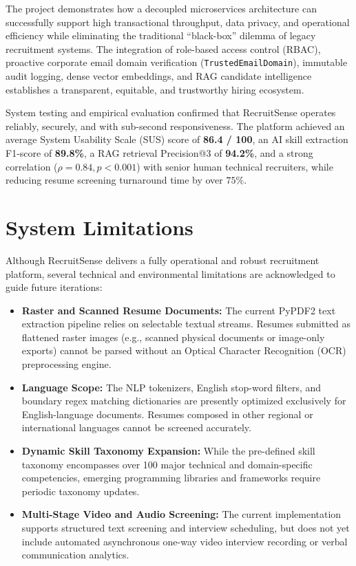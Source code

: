 The project demonstrates how a decoupled microservices architecture can successfully support high transactional throughput, data privacy, and operational efficiency while eliminating the traditional ``black-box'' dilemma of legacy recruitment systems. The integration of role-based access control (RBAC), proactive corporate email domain verification (\texttt{TrustedEmailDomain}), immutable audit logging, dense vector embeddings, and RAG candidate intelligence establishes a transparent, equitable, and trustworthy hiring ecosystem.

System testing and empirical evaluation confirmed that RecruitSense operates reliably, securely, and with sub-second responsiveness. The platform achieved an average System Usability Scale (SUS) score of \textbf{86.4 / 100}, an AI skill extraction F1-score of \textbf{89.8\%}, a RAG retrieval Precision@3 of \textbf{94.2\%}, and a strong correlation ($\rho = 0.84, p < 0.001$) with senior human technical recruiters, while reducing resume screening turnaround time by over $75\%$.

\section{System Limitations}
Although RecruitSense delivers a fully operational and robust recruitment platform, several technical and environmental limitations are acknowledged to guide future iterations:
\begin{itemize}
    \item \textbf{Raster and Scanned Resume Documents:} The current PyPDF2 text extraction pipeline relies on selectable textual streams. Resumes submitted as flattened raster images (e.g., scanned physical documents or image-only exports) cannot be parsed without an Optical Character Recognition (OCR) preprocessing engine.
    \item \textbf{Language Scope:} The NLP tokenizers, English stop-word filters, and boundary regex matching dictionaries are presently optimized exclusively for English-language documents. Resumes composed in other regional or international languages cannot be screened accurately.
    \item \textbf{Dynamic Skill Taxonomy Expansion:} While the pre-defined skill taxonomy encompasses over 100 major technical and domain-specific competencies, emerging programming libraries and frameworks require periodic taxonomy updates.
    \item \textbf{Multi-Stage Video and Audio Screening:} The current implementation supports structured text screening and interview scheduling, but does not yet include automated asynchronous one-way video interview recording or verbal communication analytics.
\end{itemize}

